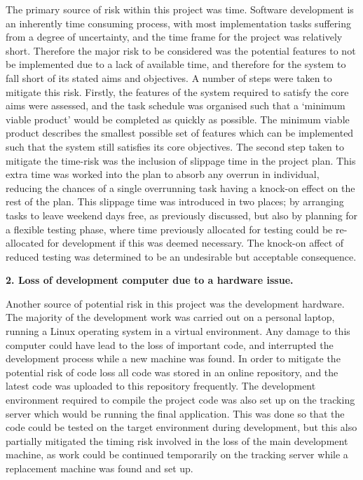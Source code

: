 The primary source of risk within this project was time. Software development is an inherently time consuming process, with most implementation tasks suffering from a degree of uncertainty, and the time frame for the project was relatively short. Therefore the major risk to be considered was the potential features to not be implemented due to a lack of available time, and therefore for the system to fall short of its stated aims and objectives. A number of steps were taken to mitigate this risk. Firstly, the features of the system required to satisfy the core aims were assessed, and the task schedule was organised such that a `minimum viable product' would be completed as quickly as possible. The minimum viable product describes the smallest possible set of features which can be implemented such that the system still satisfies its core objectives. The second step taken to mitigate the time-risk was the inclusion of slippage time in the project plan. This extra time was worked into the plan to absorb any overrun in individual, reducing the chances of a single overrunning task having a knock-on effect on the rest of the plan. This slippage time was introduced in two places; by arranging tasks to leave weekend days free, as previously discussed, but also by planning for a flexible testing phase, where time previously allocated for testing could be re-allocated for development if this was deemed necessary. The knock-on affect of reduced testing was determined to be an undesirable but acceptable consequence.

\textbf{2. Loss of development computer due to a hardware issue.}

Another source of potential risk in this project was the development hardware. The majority of the development work was carried out on a personal laptop, running a Linux operating system in a virtual environment. Any damage to this computer could have lead to the loss of important code, and interrupted the development process while a new machine was found. In order to mitigate the potential risk of code loss all code was stored in an online repository, and the latest code was uploaded to this repository frequently. The development environment required to compile the project code was also set up on the tracking server which would be running the final application. This was done so that the code could be tested on the target environment during development, but this also partially mitigated the timing risk involved in the loss of the main development machine, as work could be continued temporarily on the tracking server while a replacement machine was found and set up.

